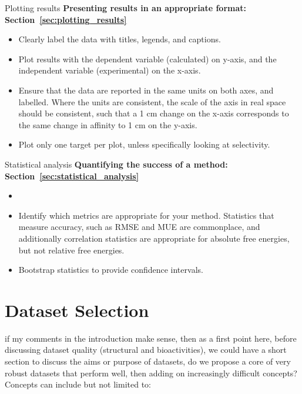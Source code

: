 \documentclass[9pt,bestpractices]{livecoms}
\begin{document}
\begin{Checklists*}


\begin{checklist}{Plotting results}
\textbf{Presenting results in an appropriate format: Section~\ref{sec:plotting_results}}
\begin{itemize}
\item Clearly label the data with titles, legends, and captions.
\item Plot results with the dependent variable (calculated) on y-axis, and the independent variable (experimental) on the x-axis. 
\item Ensure that the data are reported in the same units on both axes, and labelled. Where the units are consistent, the scale of the axis in real space should be consistent, such that a 1 cm change on the x-axis corresponds to the same change in affinity to 1 cm on the y-axis.
\item Plot only one target per plot, unless specifically looking at selectivity.
\end{itemize}
\end{checklist}

\begin{checklist}{Statistical analysis}
\textbf{Quantifying the success of a method: Section~\ref{sec:statistical_analysis}}
\begin{itemize}
\item 
\item Identify which metrics are appropriate for your method. Statistics that measure accuracy, such as RMSE and MUE are commonplace, and additionally correlation statistics are appropriate for absolute free energies, but not relative free energies.
\item Bootstrap statistics to provide confidence intervals. 
\end{itemize}
\end{checklist}


\end{Checklists*}






\section{Dataset Selection}

if my comments in the introduction make sense, then as a first point here, before discussing dataset quality (structural and bioactivities), we could have a short section to discuss the aims or purpose of datasets, do we propose a core of very robust datasets that perform well, then adding on increasingly difficult concepts? Concepts can include but not limited to:
\end{document}
